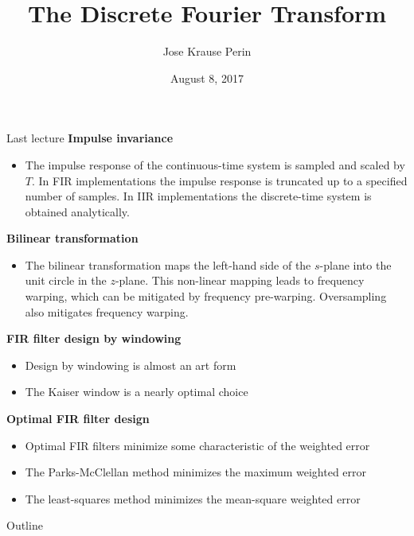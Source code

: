 \documentclass[10pt, handout]{beamer}
\title[EE 264]{The Discrete Fourier Transform}
\author{Jose Krause Perin}
\institute{Stanford University}
\date{August 8, 2017}
\begin{document}
\begin{frame}
  \titlepage
\end{frame}

%
\begin{frame}{Last lecture}
\textbf{Impulse invariance}
\begin{itemize}
	\item The impulse response of the continuous-time system is sampled and scaled by $T$. In FIR implementations the impulse response is truncated up to a specified number of samples. In IIR implementations the discrete-time system is obtained analytically.
\end{itemize}

\textbf{Bilinear transformation}
\begin{itemize}
	\item The bilinear transformation maps the left-hand side of the $s$-plane into the unit circle in the $z$-plane. This non-linear mapping leads to frequency warping, which can be mitigated by frequency pre-warping. Oversampling also mitigates frequency warping.
\end{itemize}

\textbf{FIR filter design by windowing}
\begin{itemize}
	\item Design by windowing is almost an art form
	\item The Kaiser window is a nearly optimal choice
\end{itemize}

\textbf{Optimal FIR filter design}
\begin{itemize}
	\item Optimal FIR filters minimize some characteristic of the weighted error
	\item The Parks-McClellan method minimizes the maximum weighted error
	\item The least-squares method minimizes the mean-square weighted error
\end{itemize}	
\end{frame}

%
\begin{frame}{Outline}
	\tableofcontents
\end{frame}

%
\end{document}
